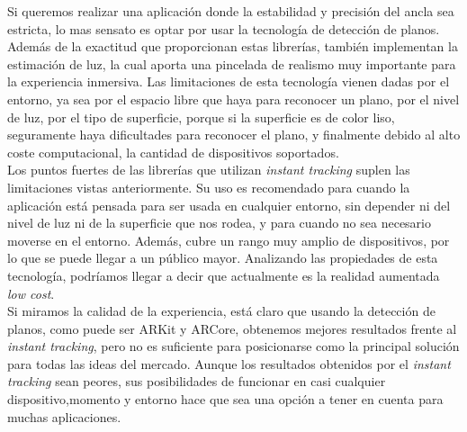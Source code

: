 Si queremos realizar una aplicación donde la estabilidad y precisión del ancla sea estricta, lo mas sensato es optar por usar la tecnología de detección de planos. Además de la exactitud que proporcionan estas librerías, también implementan la estimación de luz, la cual aporta una pincelada de realismo muy importante para la experiencia inmersiva. Las limitaciones de esta tecnología vienen dadas por el entorno, ya sea por el espacio libre que haya para reconocer un plano, por el nivel de luz, por el tipo de superficie, porque si la superficie es de color liso, seguramente haya dificultades para reconocer el plano, y finalmente debido al alto coste computacional, la cantidad de dispositivos soportados.\\

Los puntos fuertes de las librerías que utilizan \textit{instant tracking} suplen las limitaciones vistas anteriormente. Su uso es recomendado para cuando la aplicación está pensada para ser usada en cualquier entorno, sin depender ni del nivel de luz ni de la superficie que nos rodea, y para cuando no sea necesario moverse en el entorno. Además, cubre un rango muy amplio de dispositivos\cite{wikitudeInstant}, por lo que se puede llegar a un público mayor. Analizando las propiedades de esta tecnología, podríamos llegar a decir que actualmente es la realidad aumentada \textit{low cost}. \\

Si miramos la calidad de la experiencia, está claro que usando la detección de planos, como puede ser ARKit y ARCore, obtenemos mejores resultados frente al \textit{instant tracking}, pero no es suficiente para posicionarse como la principal solución para todas las ideas del mercado. Aunque los resultados obtenidos por el \textit{instant tracking} sean peores, sus posibilidades de funcionar en casi cualquier dispositivo,momento y entorno hace que sea una opción a tener en cuenta para muchas aplicaciones.



















\noindent